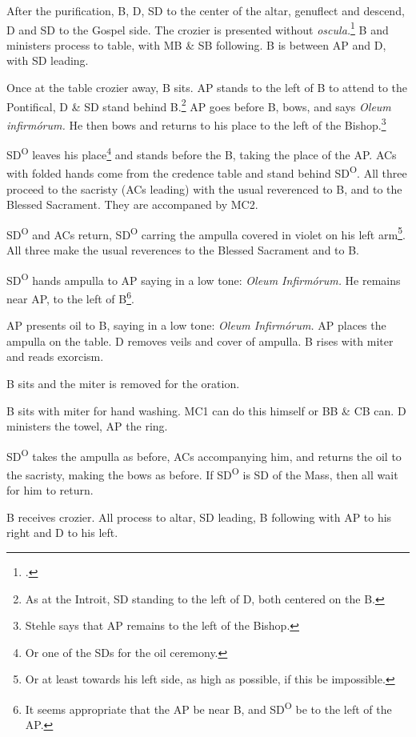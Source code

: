 {\rubric After the purification, B, D, SD to the center of the altar, genuflect
and descend, D and SD to the Gospel side. The crozier is presented without
\textit{oscula.}\footcite[184]{stehle} B and ministers process to table, with
MB \& SB following. B is between AP and D, with SD leading.

\rubric Once at the table crozier away, B sits. AP stands to the left of B to
attend to the Pontifical, D \& SD stand behind B.\footnote{As at the Introit,
SD standing to the left of D, both centered on the B.} AP goes before B, bows,
and says \textit{Oleum infirmórum.} He then bows and returns to his place to
the left of the Bishop.\footnote{Stehle says that AP remains to the left of the
Bishop.}

\rubric SD\textsuperscript{O} leaves his place\footnote{Or one of the SDs for
the oil ceremony.} and stands before the B, taking the place of the AP. ACs
with folded hands come from the credence table and stand behind
SD\textsuperscript{O}. All three proceed to the sacristy (ACs leading) with the
usual reverenced to B, and to the Blessed Sacrament. They are accompaned by
MC2.

\rubric SD\textsuperscript{O} and ACs return, SD\textsuperscript{O} carring the
ampulla covered in violet on his left arm\footnote{Or at least towards his left
side, as high as possible, if this be impossible.}. All three make the usual
reverences to the Blessed Sacrament and to B.

\rubric SD\textsuperscript{O} hands ampulla to AP saying in a low tone:
\textit{Oleum Infirmórum.} He remains near AP, to the left of B\footnote{It
seems appropriate that the AP be near B, and SD\textsuperscript{O} be to the
left of the AP.}.

\rubric AP presents oil to B, saying in a low tone: \textit{Oleum Infirmórum.}
AP places the ampulla on the table. D removes veils and cover of ampulla. B
rises with miter and reads exorcism.

\rubric B sits and the miter is removed for the oration.

\rubric B sits with miter for hand washing. MC1 can do this himself or BB \& CB
can. D ministers the towel, AP the ring.

\rubric SD\textsuperscript{O} takes the ampulla as before, ACs accompanying
him, and returns the oil to the sacristy, making the bows as before. If
SD\textsuperscript{O} is SD of the Mass, then all wait for him to return. 

\rubric B receives crozier. All process to altar, SD leading, B following with
AP to his right and D to his left.

}
